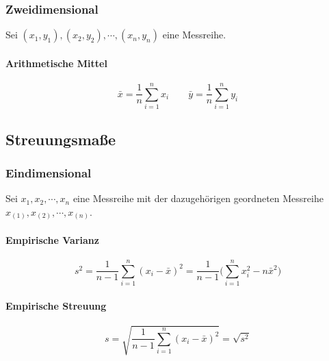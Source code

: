 \documentclass[a4paper, 11pt, accentcolor = tud3b]{tudreport}
\begin{document}
                \subsubsection{Zweidimensional}
                    Sei \( (x_1, y_1), (x_2, y_2), \cdots, (x_n, y_n) \) eine Messreihe.
                    
                    \paragraph{Arithmetische Mittel}
                    \begin{equation*}
	                    \bar{x} = \frac{1}{n} \sum_{i = 1}^{n} x_i \qquad \bar{y} = \frac{1}{n} \sum_{i = 1}^{n} y_i
                    \end{equation*}

            \subsection{Streuungsmaße}
                \subsubsection{Eindimensional}
                    Sei \( x_1, x_2, \cdots, x_n \) eine Messreihe mit der dazugehörigen geordneten Messreihe \( x_{(1)}, x_{(2)}, \cdots, x_{(n)} \).
                    
                    \paragraph{Empirische Varianz}
                    \begin{equation*}
	                    s^2 = \frac{1}{n - 1} \sum_{i = 1}^{n} (x_i - \bar{x})^2 = \frac{1}{n - 1} \Bigg( \sum_{i = 1}^{n} x_i^2 - n \bar{x}^2 \Bigg)
                    \end{equation*}
                    
                    \paragraph{Empirische Streuung}
                    \begin{equation*}
	                    s = \sqrt{\frac{1}{n - 1} \sum_{i = 1}^{n} (x_i - \bar{x})^2} = \sqrt{s^2}
                    \end{equation*}
                    
\end{document}

